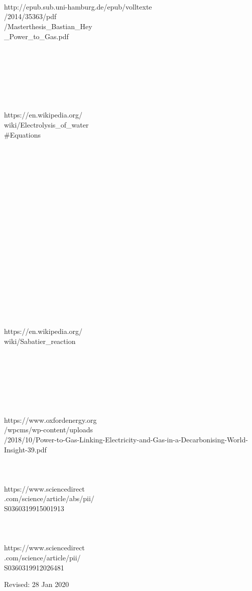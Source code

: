 \begin{parcolumns}[colwidths={1=2.5 cm, 2=10 cm, 3=2.5 cm}]{3}
{\begin{tiny}
\\ \\ \\ 
http://epub.sub.uni-hamburg.de/epub/volltexte\\/2014/35363/pdf\\/Masterthesis\_Bastian\_Hey \\
\_Power\_to\_Gas.pdf
\\ \\ \\ \\ \\ \\ \\ \\ 
https://en.wikipedia.org/\\wiki/Electrolysis\_of\_water \\ 
\#Equations
\\ \\ \\ \\ \\ \\ \\ \\ \\ \\ \\ \\ \\ \\ \\ \\ \\ \\ \\ \\
https://en.wikipedia.org/\\wiki/Sabatier\_reaction
\\ \\ \\ \\ \\ \\ \\ \\
https://www.oxfordenergy.org\\/wpcms/wp-content/uploads\\/2018/10/Power-to-Gas-Linking-Electricity-and-Gas-in-a-Decarbonising-World-Insight-39.pdf
\\ \\ \\ \\
https://www.sciencedirect\\.com/science/article/abs/pii/\\S0360319915001913
\\ \\ \\ \\
https://www.sciencedirect\\.com/science/article/pii/\\S0360319912026481
\end{tiny}
}

\end{parcolumns}
\begin{flushright}
Revised: 28 Jan 2020
\end{flushright}
\clearpage
\cfoot{}